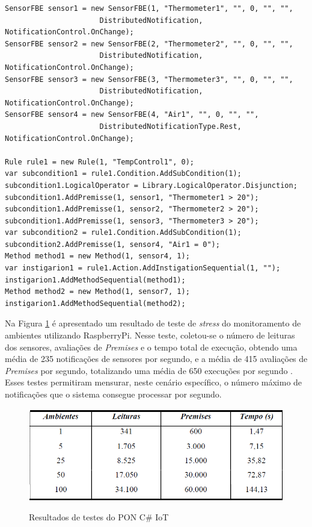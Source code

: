 \begin{lstlisting}[caption = {Exemplo de \textit{Rule} com o \textit{Framework} PON C\# IoT},
  source = {Adaptado de \citeonline{msc_oliveira_2019}}, float=htb,
  label = {cod:rule_iot}]
SensorFBE sensor1 = new SensorFBE(1, "Thermometer1", "", 0, "", "", 
                      DistributedNotification, NotificationControl.OnChange);
SensorFBE sensor2 = new SensorFBE(2, "Thermometer2", "", 0, "", "",
                      DistributedNotification, NotificationControl.OnChange);
SensorFBE sensor3 = new SensorFBE(3, "Thermometer3", "", 0, "", "", 
                      DistributedNotification, NotificationControl.OnChange);
SensorFBE sensor4 = new SensorFBE(4, "Air1", "", 0, "", "", 
                      DistributedNotificationType.Rest, NotificationControl.OnChange);

Rule rule1 = new Rule(1, "TempControl1", 0);
var subcondition1 = rule1.Condition.AddSubCondition(1);
subcondition1.LogicalOperator = Library.LogicalOperator.Disjunction;
subcondition1.AddPremisse(1, sensor1, "Thermometer1 > 20");
subcondition1.AddPremisse(1, sensor2, "Thermometer2 > 20");
subcondition1.AddPremisse(1, sensor3, "Thermometer3 > 20");
var subcondition2 = rule1.Condition.AddSubCondition(1);
subcondition2.AddPremisse(1, sensor4, "Air1 = 0");
Method method1 = new Method(1, sensor4, 1);
var instigarion1 = rule1.Action.AddInstigationSequential(1, "");
instigarion1.AddMethodSequential(method1);
Method method2 = new Method(1, sensor7, 1);
instigarion1.AddMethodSequential(method2);
\end{lstlisting}

Na Figura \ref{fig:teste_pon_iot} é apresentado um resultado de teste de
\textit{stress} do monitoramento de ambientes utilizando RaspberryPi. Nesse
teste, coletou-se o número de leituras dos sensores, avaliações de
\textit{Premises} e o tempo total de execução, obtendo uma média de 235
notificações de sensores por segundo, e a média de 415 avaliações de
\textit{Premises} por segundo, totalizando uma média de 650 execuções por
segundo . Esses testes permitiram mensurar, neste
cenário específico, o número máximo de notificações que o sistema consegue
processar por segundo.

\begin{figure}[!htb]
  \centering
  \caption{Resultados de testes do PON C\# IoT}
  \includegraphics[width=.75\textwidth]{../figures/teste_pon_iot.png}
  \label{fig:teste_pon_iot}
\end{figure}

